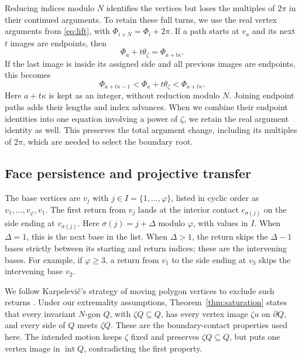 \documentclass[11pt,a4paper]{article}
\theoremstyle{definition}
\theoremstyle{remark}
\numberwithin{equation}{section}
\begin{document}
Reducing indices modulo $N$ identifies the vertices but loses the multiples of $2\pi$ in their continued arguments. To retain these full turns, we use the real vertex arguments from \eqref{eq:lift}, with $\Phi_{i+N}=\Phi_i+2\pi$. If a path starts at $v_a$ and its next $t$ images are endpoints, then
\begin{equation}\label{eq:path-lift}
 \Phi_a+t\theta_\zeta=\Phi_{a+t\kappa}.
\end{equation}
If the last image is inside its assigned side and all previous images are endpoints, this becomes
\[
 \Phi_{a+t\kappa-1}<\Phi_a+t\theta_\zeta<\Phi_{a+t\kappa}.
\]
Here $a+t\kappa$ is kept as an integer, without reduction modulo $N$. Joining endpoint paths adds their lengths and index advances. When we combine their endpoint identities into one equation involving a power of $\zeta$, we retain the real argument identity as well. This preserves the total argument change, including its multiples of $2\pi$, which are needed to select the boundary root.


\subsection{Face persistence and projective transfer}

The base vertices are $v_j$ with $j\in I=\{1,\ldots,\varphi\}$, listed in cyclic order as $v_1,\ldots,v_\varphi,v_1$. The first return from $v_j$ lands at the interior contact $c_{\sigma(j)}$ on the side ending at $v_{\sigma(j)}$. Here $\sigma(j)=j+\Delta$ modulo $\varphi$, with values in $I$. When $\Delta=1$, this is the next base in the list. When $\Delta>1$, the return skips the $\Delta-1$ bases strictly between its starting and return indices; these are the intervening bases. For example, if $\varphi\ge3$, a return from $v_1$ to the side ending at $v_3$ skips the intervening base $v_2$.

We follow Karpelevi\v{c}'s strategy of moving polygon vertices to exclude such returns \cite{Karp}. Under our extremality assumptions, Theorem~\ref{thm:saturation} states that every invariant $N$-gon $Q$, with $\zeta Q\subseteq Q$, has every vertex image $\zeta u$ on $\partial Q$, and every side of $Q$ meets $\zeta Q$. These are the boundary-contact properties used here. The intended motion keeps $\zeta$ fixed and preserves $\zeta Q\subseteq Q$, but puts one vertex image in $\operatorname{int}Q$, contradicting the first property.
\end{document}
